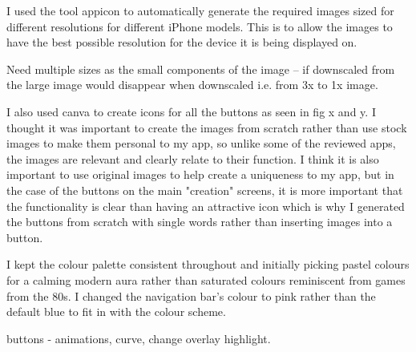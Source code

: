 \documentclass[11pt]{article}
\begin{document}
            I used the tool appicon %
            to automatically generate the required images sized for different resolutions for different iPhone models. This is to allow the images to have the best possible resolution for the device it is being displayed on.  
            
            Need multiple sizes as the small components of the image – if downscaled from the large image would disappear when downscaled i.e. from 3x to 1x image. 
        
            I also used canva to create icons for all the buttons as  seen in fig x and y. I thought it was important to create the images from scratch rather than use stock images to make them personal to my app, so unlike some of the reviewed apps, the images are relevant and clearly relate to their function. I think it is also important to use original images to help create a uniqueness to my app, but in the case of the buttons on the main "creation" screens, it is more important that the functionality is clear than having an attractive icon which is why I generated the buttons from scratch with single words rather than inserting images into a button.
            
            I kept the colour palette consistent throughout and initially picking pastel colours for a calming modern  aura rather than saturated colours reminiscent from games from the 80s. I changed the navigation bar's colour to pink rather than the default blue to fit in with the colour scheme. 
            
            
            buttons - animations, curve, change overlay highlight. 
            
\end{document}
